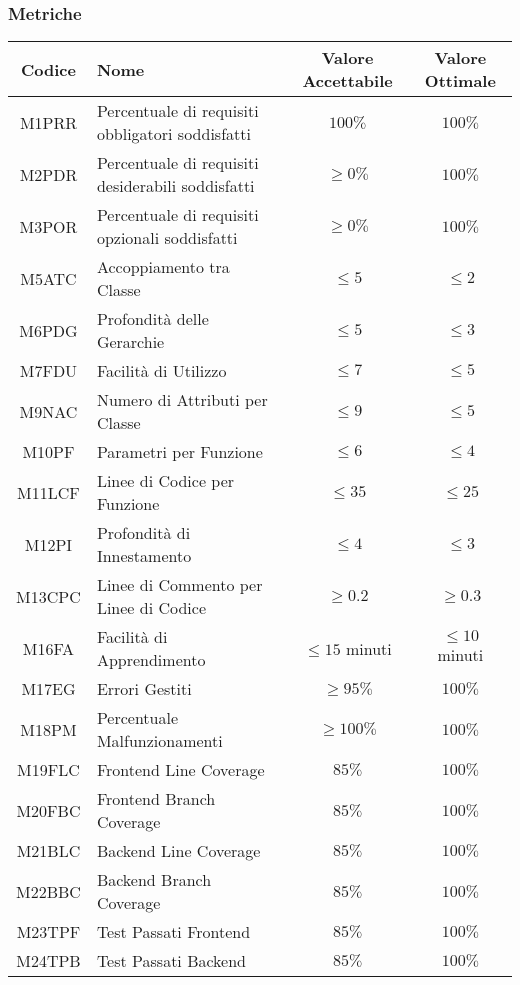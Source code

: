 \subsubsection{Metriche}
\begin{center}
	\renewcommand{\arraystretch}{1.8}
	\begin{tabular}{ |c|m{14em}|c|c|}
		\hline
		\textbf{Codice} & \textbf{Nome} & \textbf{Valore Accettabile} & \textbf{Valore Ottimale} \\
		\hline
		M1PRR & Percentuale di requisiti obbligatori soddisfatti & $ 100\% $ & $ 100\% $ \\
		\hline
		M2PDR & Percentuale di requisiti desiderabili soddisfatti & $ \geq 0\% $ & $ 100\% $ \\
		\hline
		M3POR & Percentuale di requisiti opzionali soddisfatti & $ \geq 0\% $ & $ 100\% $ \\
	  \hline
		M5ATC & Accoppiamento tra Classe & $ \leq 5 $ & $ \leq 2 $\\
		\hline
		M6PDG & Profondità delle Gerarchie & $ \leq 5 $ & $ \leq 3 $\\
		\hline
		M7FDU & Facilità di Utilizzo & $ \leq 7 $ & $ \leq 5 $\\
		\hline
		M9NAC & Numero di Attributi per Classe & $ \leq 9 $ & $ \leq 5 $\\
		\hline
		M10PF & Parametri per Funzione & $ \leq 6 $ & $ \leq 4 $\\
		\hline
		M11LCF & Linee di Codice per Funzione & $ \leq 35 $ & $ \leq 25 $\\
		\hline
		M12PI & Profondità di Innestamento & $ \leq 4 $ & $ \leq 3 $\\
		\hline
		M13CPC & Linee di Commento per Linee di Codice & $ \geq 0.2 $ & $ \geq 0.3 $\\
		\hline
		M16FA & Facilità di Apprendimento & $ \leq 15 $ minuti & $ \leq 10 $ minuti\\
		\hline
		M17EG & Errori Gestiti & $ \geq 95\% $ & $  100\% $\\
    \hline
    M18PM & Percentuale Malfunzionamenti & $ \geq 100\% $ & $  100\% $\\
		\hline
		M19FLC & Frontend Line Coverage & $  85\% $ & $ 100\% $\\
		\hline
		M20FBC & Frontend Branch Coverage & $  85\% $ & $ 100\% $\\
		\hline
		M21BLC & Backend Line Coverage & $  85\% $ & $ 100\% $\\
		\hline
		M22BBC & Backend Branch Coverage & $  85\% $ & $ 100\% $\\
		\hline
    M23TPF & Test Passati Frontend & $  85\% $ & $ 100\% $\\
		\hline
    M24TPB & Test Passati Backend  & $  85\% $ & $ 100\% $\\
		\hline
    
	\end{tabular}
\end{center}